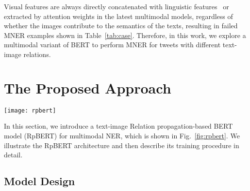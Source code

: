 \documentclass[letterpaper]{article} \usepackage{aaai21}  \usepackage{times}  \usepackage{helvet} \usepackage{courier}  \usepackage[hyphens]{url}  \usepackage{graphicx} \urlstyle{rm} \def\UrlFont{\rm}  \usepackage{natbib}  \usepackage{caption} \frenchspacing  \setlength{\pdfpagewidth}{8.5in}  \setlength{\pdfpageheight}{11in}
\begin{document}
\smallskip
Visual features are always directly concatenated with linguistic features~\cite{yu2019adapting} or extracted by attention weights in the latest multimodal models, regardless of whether the images contribute to the semantics of the texts, resulting in failed MNER examples shown in Table~\ref{tab:case}.
Therefore, in this work, we explore a multimodal variant of BERT to perform MNER for tweets with different text-image relations.



























\section{The Proposed Approach}


\begin{figure*}[tb]
\centering
\texttt{[image: rpbert]}
\caption{The RpBERT architecture overview. Two RpBERTs share the same structure and parameters.}\label{fig:rpbert}
\end{figure*}


In this section, we introduce a text-image Relation propagation-based BERT model (RpBERT) for multimodal NER, which is shown in Fig.~\ref{fig:rpbert}.
We illustrate the RpBERT architecture and then describe its training procedure in detail.
















\subsection{Model Design}
\label{sec:RpBERT}
\end{document}
